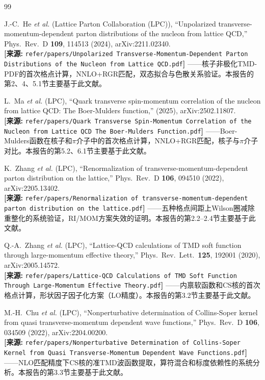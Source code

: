 \documentclass[12pt,a4paper]{ctexart}
\theoremstyle{definition}
\begin{document}
\begin{thebibliography}{99}

J.-C.~He \textit{et al.} (Lattice Parton Collaboration (LPC)),
``Unpolarized transverse-momentum-dependent parton distributions of the nucleon from lattice QCD,''
Phys.\ Rev.\ D \textbf{109}, 114513 (2024), arXiv:2211.02340.
\\\textbf{[来源:} \texttt{refer/papers/Unpolarized Transverse-Momentum-Dependent Parton Distributions of the Nucleon from Lattice QCD.pdf}\textbf{]}
——核子非极化TMD-PDF的首次格点计算，NNLO+RGR匹配，双态拟合与色散关系验证。本报告的第2、4、5.1节主要基于此文献。

L.~Ma \textit{et al.} (LPC),
``Quark transverse spin-momentum correlation of the nucleon from lattice QCD: The Boer-Mulders function,''
(2025), arXiv:2502.11807.
\\\textbf{[来源:} \texttt{refer/papers/Quark Transverse Spin-Momentum Correlation of the Nucleon from Lattice QCD The Boer-Mulders Function.pdf}\textbf{]}
——Boer-Mulders函数在核子和$\pi$介子中的首次格点计算，NNLO+RGR匹配，核子与$\pi$介子对比。本报告的第5.2、6.1节主要基于此文献。

K.~Zhang \textit{et al.} (LPC),
``Renormalization of transverse-momentum-dependent parton distribution on the lattice,''
Phys.\ Rev.\ D \textbf{106}, 094510 (2022), arXiv:2205.13402.
\\\textbf{[来源:} \texttt{refer/papers/Renormalization of transverse-momentum-dependent parton distribution on the lattice.pdf}\textbf{]}
——五种格点间距上Wilson圈减除重整化的系统验证，RI/MOM方案失效的证明。本报告的第2.2--2.4节主要基于此文献。

Q.-A.~Zhang \textit{et al.} (LPC),
``Lattice-QCD calculations of TMD soft function through large-momentum effective theory,''
Phys.\ Rev.\ Lett.\ \textbf{125}, 192001 (2020), arXiv:2005.14572.
\\\textbf{[来源:} \texttt{refer/papers/Lattice-QCD Calculations of TMD Soft Function Through Large-Momentum Effective Theory.pdf}\textbf{]}
——内禀软函数和CS核的首次格点计算，形状因子因子化方案（LO精度）。本报告的第3.2节主要基于此文献。

M.-H.~Chu \textit{et al.} (LPC),
``Nonperturbative determination of Collins-Soper kernel from quasi transverse-momentum dependent wave functions,''
Phys.\ Rev.\ D \textbf{106}, 034509 (2022), arXiv:2204.00200.
\\\textbf{[来源:} \texttt{refer/papers/Nonperturbative Determination of Collins-Soper Kernel from Quasi Transverse-Momentum Dependent Wave Functions.pdf}\textbf{]}
——NLO匹配精度下CS核的准TMD波函数提取，算符混合和标度依赖性的系统分析。本报告的第3.3节主要基于此文献。


\end{thebibliography}
\end{document}
